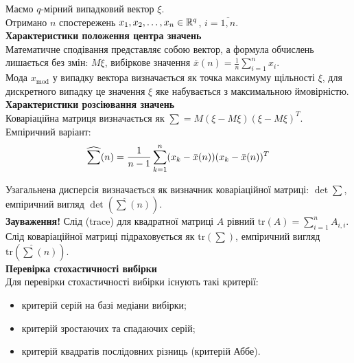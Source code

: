 Маємо $q$-мірний випадковий вектор $\xi$. \\

Отримано $n$ спостережень $x_1, x_2, \ldots, x_n \in \mathbb{R}^q$, $i=\overline{1,n}$. \\

\textbf{Характеристики положення центра значень} \\

Математичне сподівання представляє собою вектор, а формула обчислень лишається без змін: $M\xi$, вибіркове значення $\bar{x}(n) = \frac{1}{n} \sum_{i=1}^n x_i$. \\

Мода $x_{\text{mod}}$ у випадку вектора визначається як точка максимуму щільності $\xi$, для дискретного випадку це значення $\xi$ яке набувається з максимальною ймовірністю. \\

\textbf{Характеристики розсіювання значень} \\

Коваріаційна матриця визначається як $\sum = M (\xi - M \xi) (\xi - M \xi)^T$. Емпіричний варіант: 
\[ \widehat{\displaystyle\sum\limits}(n) = \dfrac{1}{n-1} \displaystyle\sum\limits_{k=1}^n (x_k - \bar{x}(n)) (x_k - \bar{x}(n))^T \] 

Узагальнена дисперсія визначається як визначник коваріаційної матриці: $\det \sum$, емпіричний вигляд $\det (\widehat{\sum}(n))$. \\

\textbf{Зауваження!} Слід (trace) для квадратної матриці $A$ рівний $\text{tr} (A) = \sum_{i=1}^n A_{i,i}$. \\

Слід коваріаційної матриці підраховується як $\text{tr} \left(\sum\right)$, емпіричний вигляд $\text{tr} \left(\widehat{\sum}(n)\right)$. \\

\textbf{Перевірка стохастичності вибірки} \\

Для перевірки стохастичності вибірки існують такі критерії:
\begin{itemize}
    \item критерій серій на базі медіани вибірки;
    
    \item критерій зростаючих та спадаючих серій;
    
    \item критерій квадратів послідовних різниць (критерій Аббе).
\end{itemize}

